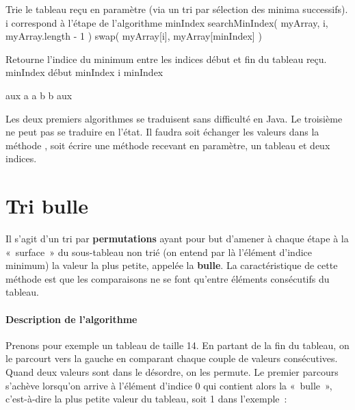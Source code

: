 	\begin{pseudocode}
		\LComment Trie le tableau reçu en paramètre 
		(via un tri par sélection des minima successifs).
			\RComment i correspond à l’étape 
			\RComment de l’algorithme
				\Let minIndex \Gets searchMinIndex( myArray, i, 
					myArray.length - 1 )
				\Stmt swap( myArray[i], myArray[minIndex] )
			\EndFor
		\EndAlgo

		\Empty
		\LComment Retourne l’indice du minimum entre les indices début 
		et fin du tableau reçu.
			\Let minIndex \Gets début
					\Let minIndex \Gets i
				\EndIf
			\EndFor
			\Return minIndex
		\EndAlgo

		\Empty
			\Let aux \Gets a
			\Let a \Gets b
			\Let b \Gets aux
		\EndAlgo
	\end{pseudocode}

	Les deux premiers algorithmes se traduisent sans difficulté en Java. Le
	troisième ne peut pas se traduire en l'état. Il faudra soit échanger les
	valeurs dans la méthode , soit écrire une méthode
	 recevant en paramètre, un tableau et deux indices. 

	\clearpage
\section{Tri bulle}
	
	Il s’agit d’un tri par \textbf{permutations} 
	ayant pour but d’amener à chaque étape à la «~surface~» 
	du sous-tableau non trié 
	(on entend par là l’élément d’indice minimum) 
	la valeur la plus petite, 
	appelée la \textbf{bulle}. 
	La caractéristique de cette méthode est que les
	comparaisons ne se font qu’entre éléments consécutifs du tableau.

	\paragraph{Description de l’algorithme}

	Prenons pour exemple un tableau de taille 14. En partant de la fin du
	tableau, on le parcourt vers la gauche en comparant chaque couple de
	valeurs consécutives. Quand deux valeurs sont dans le désordre, on les
	permute. Le premier parcours s’achève lorsqu’on arrive à l’élément
	d’indice 0 qui contient alors la «~bulle~»,
	c’est-à-dire la plus petite valeur du tableau, soit 1 dans l'exemple~:

